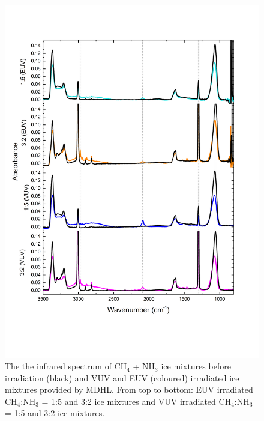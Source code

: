 \begin{figure}
\centering
\includegraphics[width=\textwidth]{figures/chapter3/EUV_widerange.png}
\caption{The the infrared spectrum of CH$_4$ + NH$_3$ ice mixtures before irradiation (black) and VUV and EUV (coloured) irradiated ice mixtures provided by MDHL. From top to bottom: EUV irradiated CH$_4$:NH$_3$ = 1:5 and 3:2 ice mixtures and VUV irradiated CH$_4$:NH$_3$ = 1:5 and 3:2 ice mixtures.}
\label{fig:NSRRC_MDHL_IR}
\end{figure}


